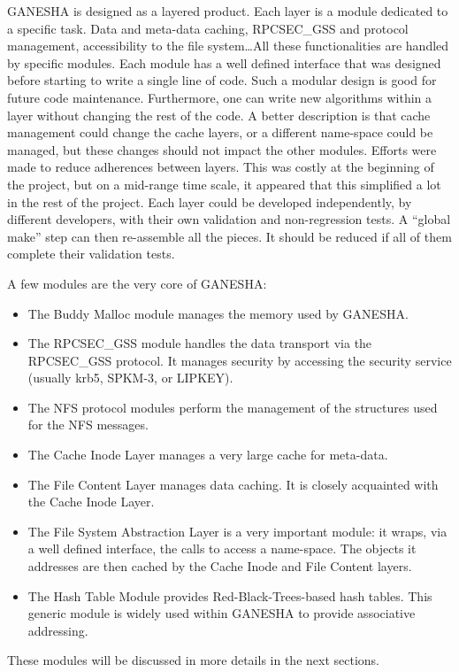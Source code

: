 \documentclass[final]{ols}
\begin{document}
GANESHA is designed as a layered product. Each layer is a module
dedicated to a specific task.  Data and meta-data caching, RPCSEC\_GSS
and protocol management, accessibility to the file system\ldots All these
functionalities are handled by specific modules. Each module has a
well defined interface that was designed before starting to write a
single line of code.  Such a modular design is good for future code
maintenance. Furthermore, one can write new algorithms within a layer
without changing the rest of the code.  A better description is that cache
management could change the cache layers, or a different name-space
could be managed, but these changes should not impact the other
modules. Efforts were made to reduce adherences between layers. This
was costly at the beginning of the project, but on a mid-range time
scale, it appeared that this simplified a lot in the rest of the project.
Each layer could be developed independently, by different developers,
with their own validation and non-regression tests. A ``global make''
step can then re-assemble all the pieces. It should be reduced if all
of them complete their validation tests.

A few modules are the very core of GANESHA:
\begin{itemize}
\item The Buddy Malloc module manages the memory used by GANESHA.
\item The RPCSEC\_GSS module handles the data transport via the
  RPCSEC\_GSS protocol. It manages security by accessing the security
  service (usually krb5, SPKM-3, or LIPKEY).
\item The NFS protocol modules perform the management of the
  structures used for the NFS messages.
\item The Cache Inode Layer manages a very large cache for meta-data. 
\item The File Content Layer manages data caching. It is closely
  acquainted with the Cache Inode Layer.
\item The File System Abstraction Layer is a very important module: it
  wraps, via a well defined interface, the calls to access a
  name-space. The objects it addresses are then cached by the Cache
  Inode and File Content layers.
\item The Hash Table Module provides Red-Black-Trees-based hash tables.
  This generic module is widely used within GANESHA to provide
  associative addressing.
\end{itemize}

These modules will be discussed in more details in the next sections. 
\end{document}
